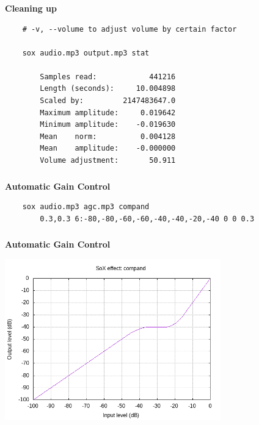 \documentclass[usenames,dvipsnames, 18pt, compress, aspectratio=169]{beamer}
\begin{document}
\begin{frame}[fragile]{}
    \frametitle{}
    \begin{center}
        \textbf{Cleaning up}
        \vspace{0.2cm}

        \begin{verbatim}
    # -v, --volume to adjust volume by certain factor

    sox audio.mp3 output.mp3 stat

        Samples read:            441216
        Length (seconds):     10.004898
        Scaled by:         2147483647.0
        Maximum amplitude:     0.019642
        Minimum amplitude:    -0.019630
        Mean    norm:          0.004128
        Mean    amplitude:    -0.000000
        Volume adjustment:       50.911
        \end{verbatim}

    \end{center}
\end{frame}

\begin{frame}[fragile]{}
    \frametitle{}
    \begin{center}
        \textbf{Automatic Gain Control}
        \vspace{0.2cm}


        \begin{verbatim}
    sox audio.mp3 agc.mp3 compand
        0.3,0.3 6:-80,-80,-60,-60,-40,-40,-20,-40 0 0 0.3
        \end{verbatim}
    \end{center}
\end{frame}

\begin{frame}[fragile]{}
    \frametitle{}
    \begin{center}
        \textbf{Automatic Gain Control}
        \vspace{0.2cm}

        \includegraphics[width=0.7\textwidth]{agc.png}

    \end{center}
\end{frame}
\end{document}
